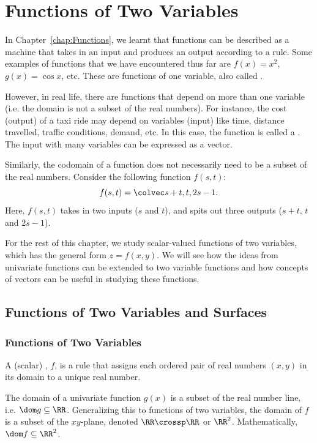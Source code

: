 \chapter{Functions of Two Variables}

In Chapter~\SS\ref{chap:Functions}, we learnt that functions can be described as a machine that takes in an input and produces an output according to a rule. Some examples of functions that we have encountered thus far are $f(x) = x^2$, $g(x) = \cos x$, etc. These are functions of one variable, also called .

However, in real life, there are functions that depend on more than one variable (i.e. the domain is not a subset of the real numbers). For instance, the cost (output) of a taxi ride may depend on variables (input) like time, distance travelled, traffic conditions, demand, etc. In this case, the function is called a . The input with many variables can be expressed as a vector. 

Similarly, the codomain of a function does not necessarily need to be a subset of the real numbers. Consider the following function $f(s, t)$: \[f(s, t) = \cveciii{s + t}{t}{2s - 1}.\] Here, $f(s, t)$ takes in two inputs ($s$ and $t$), and spits out three outputs ($s + t$, $t$ and $2s - 1$).

For the rest of this chapter, we study scalar-valued functions of two variables, which has the general form $z = f(x, y)$. We will see how the ideas from univariate functions can be extended to two variable functions and how concepts of vectors can be useful in studying these functions.

\section{Functions of Two Variables and Surfaces}

\subsection{Functions of Two Variables}

\begin{definition}
    A (scalar) , $f$, is a rule that assigns each ordered pair of real numbers $(x, y)$ in its domain to a unique real number.
\end{definition}

The domain of a univariate function $g(x)$ is a subset of the real number line, i.e. $\dom g \subseteq \RR$. Generalizing this to functions of two variables, the domain of $f$ is a subset of the $xy$-plane, denoted $\RR \crossp \RR$ or $\RR ^2$. Mathematically, $\dom f \subseteq \RR^2$.

